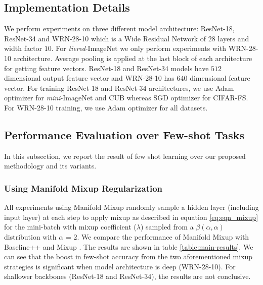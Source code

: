 \documentclass[10pt,twocolumn,letterpaper]{article}
\begin{document}
\subsection{Implementation Details}
We perform experiments on three different model architecture: ResNet-18, ResNet-34 \cite{resnet2015He} and WRN-28-10 \cite{wrn2016Zagoruyko} which is a Wide Residual Network of $28$ layers and width factor $10$. For \textit{tiered}-ImageNet we only perform experiments with WRN-28-10 architecture. Average pooling is applied at the last block of each architecture for getting feature vectors. ResNet-18 and ResNet-34 models have $512$ dimensional output feature vector and WRN-28-10 has $640$ dimensional feature vector. For training ResNet-18 and ResNet-34 architectures, we use Adam \cite{kingma2014adam} optimizer for \textit{mini}-ImageNet and CUB whereas SGD optimizer for CIFAR-FS. For WRN-28-10 training, we use Adam optimizer for all datasets.

\begin{figure*}[t]
\centering
{}
    \label{2-dplot}
\end{figure*}


\vspace{-3pt}
\subsection{Performance Evaluation over Few-shot Tasks}
\vspace{-5pt}
In this subsection, we report the result of few shot learning over our proposed methodology and its variants.
\vspace{-4pt}
\subsubsection{Using Manifold Mixup Regularization}
\vspace{-4pt}
All experiments using Manifold Mixup \cite{verma2019manifold} randomly sample a hidden layer (including input layer) at each step to apply mixup as described in equation \ref{eq:eqn_mixup} for the mini-batch with mixup coefficient ($\lambda$) sampled from a $\beta(\alpha , \alpha)$ distribution with $\alpha$ = $2$.
We compare the performance of Manifold Mixup \cite{verma2019manifold} with Baseline++ \cite{chen2019closerfewshot} and Mixup \cite{zhang2018mixup}. The results are shown in table \ref{table:main-results}. We can see that the boost in few-shot accuracy from the two aforementioned mixup strategies is significant when model architecture is deep (WRN-28-10). For shallower backbones (ResNet-18 and ResNet-34), the results are not conclusive.
\end{document}
